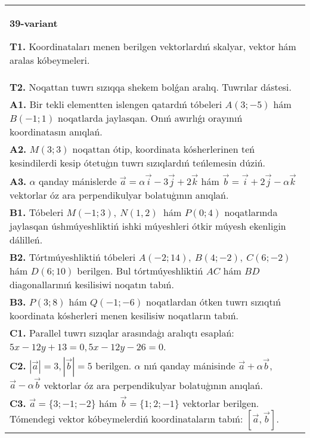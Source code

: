 \documentclass{article}
\begin{document}
\begin{tabular}{m{17cm}}
\textbf{39-variant}

\textbf{T1.} 
Koordinataları menen berilgen vektorlardıń skalyar, vektor hám aralas kóbeymeleri.
 \\
\textbf{T2.} 
Noqattan tuwrı sızıqqa shekem bolǵan aralıq. Tuwrılar dástesi.
 \\
\textbf{A1.} 
Bir tekli elementten islengen qatardıń tóbeleri
$A (3;-5) $ hám $B (-1;1) $ noqatlarda jaylasqan. Onıń awırlıǵı
orayınıń koordinatasın anıqlań.
 \\
\textbf{A2.} 
$M (3;3) $ noqattan ótip, koordinata kósherlerinen teń
kesindilerdi kesip ótetuģın tuwrı sızıqlardıń teńlemesin dúziń.
 \\
\textbf{A3.} 
$\alpha$
qanday mánislerde
$\overrightarrow{a} = \alpha\overrightarrow{i} - 3\overrightarrow{j} + 2\overrightarrow{k}$
hám
$\overrightarrow{b} = \overrightarrow{i} + 2\overrightarrow{j} - \alpha\overrightarrow{k}$
vektorlar óz ara perpendikulyar bolatuģının anıqlań.
 \\
\textbf{B1.} 
Tóbeleri \(M (-1;3),\ N (1,2) \ \) hám \(P (0;4) \)
noqatlarında jaylasqan úshmúyeshliktiń ishki múyeshleri ótkir múyesh
ekenligin dálilleń.
 \\
\textbf{B2.} 
Tórtmúyeshliktiń tóbeleri
\(A (-2;14),\ B (4;-2),\ C (6;-2) \) hám \(D (6;10) \) berilgen. Bul
tórtmúyeshliktiń $AC$ hám $BD$ diagonallarınıń kesilisiwi
noqatın tabıń.
 \\
\textbf{B3.} 
\(P (3;8) \) hám \(Q (-1;-6) \) noqatlardan ótken
tuwrı sızıqtıń koordinata kósherleri menen kesilisiw noqatların tabıń.
 \\
\textbf{C1.} 
Parallel tuwrı sızıqlar arasındaģı aralıqtı esaplań: $5x-12y+13=0, 5x-12y-26=0$.
 \\
\textbf{C2.} 
$|\vec{a}| = 3,|\vec{b}| = 5$ berilgen. $\alpha$ nıń qanday mánisinde $\vec{a} + \alpha\vec{b}$, $\vec{a} - \alpha\vec{b}$ vektorlar óz ara perpendikulyar bolatuģının anıqlań.
 \\
\textbf{C3.} 
$\vec{a} = \{ 3; - 1; - 2\}$ hám $\vec{b} = \{ 1;2; - 1\}$ vektorlar berilgen. Tómendegi vektor kóbeymelerdiń koordinataların tabıń:
$\left\lbrack \vec{a},\vec{b} \right\rbrack$.
 \\

\end{tabular}
\vspace{1cm}
\end{document}

